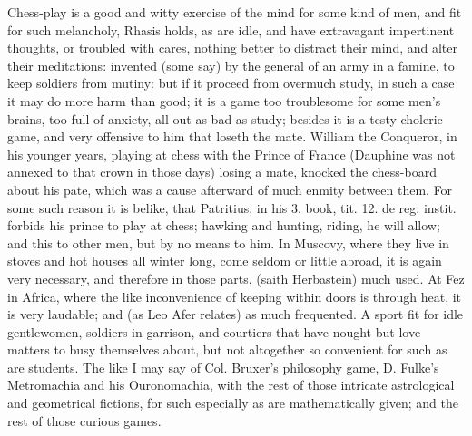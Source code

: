 {Chess-play is a good and witty exercise of the mind for some kind of
men, and fit for such melancholy, Rhasis holds, as are idle, and have
extravagant impertinent thoughts, or troubled with cares, nothing
better to distract their mind, and alter their meditations: invented
(some say) by the general of an army in a famine, to keep
soldiers from mutiny: but if it proceed from overmuch study, in such a
case it may do more harm than good; it is a game too troublesome for
some men's brains, too full of anxiety, all out as bad as study;
besides it is a testy choleric game, and very offensive to him that
loseth the mate. William the Conqueror, in his younger years,
playing at chess with the Prince of France (Dauphine was not annexed to
that crown in those days) losing a mate, knocked the chess-board about
his pate, which was a cause afterward of much enmity between them. For
some such reason it is belike, that Patritius, in his 3. book, tit. 12.
de reg. instit. forbids his prince to play at chess; hawking and
hunting, riding, \etc{} he will allow; and this to other men, but by no
means to him. In Muscovy, where they live in stoves and hot houses all
winter long, come seldom or little abroad, it is again very necessary,
and therefore in those parts, (saith Herbastein) much used. At
Fez in Africa, where the like inconvenience of keeping within doors is
through heat, it is very laudable; and (as Leo Afer relates) as
much frequented. A sport fit for idle gentlewomen, soldiers in
garrison, and courtiers that have nought but love matters to busy
themselves about, but not altogether so convenient for such as are
students. The like I may say of Col. Bruxer's philosophy game, D.
Fulke's Metromachia and his Ouronomachia, with the rest of those
intricate astrological and geometrical fictions, for such especially as
are mathematically given; and the rest of those curious games.

}
